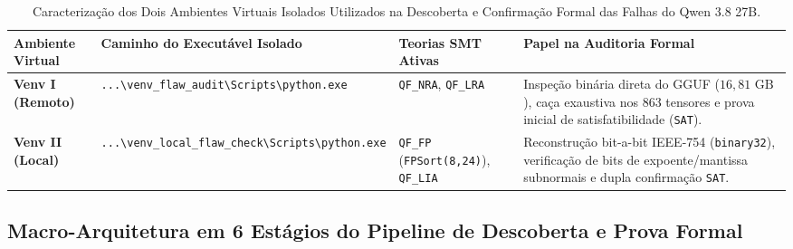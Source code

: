 \documentclass[11pt,a4paper]{article}
\theoremstyle{definition}
\begin{document}
\begin{table}[H]
\centering
\caption{Caracterização dos Dois Ambientes Virtuais Isolados Utilizados na Descoberta e Confirmação Formal das Falhas do Qwen 3.8 27B.}
\label{tab:venvs_audit}
\footnotesize
\setlength{\tabcolsep}{5pt}
\renewcommand{\arraystretch}{1.22}
\begin{tabularx}{\textwidth}{l l l X}
\toprule
\textbf{Ambiente Virtual} & \textbf{Caminho do Executável Isolado} & \textbf{Teorias SMT Ativas} & \textbf{Papel na Auditoria Formal} \\
\midrule
\textbf{Venv I (Remoto)} & \texttt{...\textbackslash venv\_flaw\_audit\textbackslash Scripts\textbackslash python.exe} & \texttt{QF\_NRA}, \texttt{QF\_LRA} & Inspeção binária direta do GGUF ($16{,}81\text{ GB}$), caça exaustiva nos 863 tensores e prova inicial de satisfatibilidade (\texttt{SAT}). \\
\textbf{Venv II (Local)} & \texttt{...\textbackslash venv\_local\_flaw\_check\textbackslash Scripts\textbackslash python.exe} & \texttt{QF\_FP} (\texttt{FPSort(8,24)}), \texttt{QF\_LIA} & Reconstrução bit-a-bit IEEE-754 (\texttt{binary32}), verificação de bits de expoente/mantissa subnormais e dupla confirmação \texttt{SAT}. \\
\bottomrule
\end{tabularx}
\end{table}

\subsection{Macro-Arquitetura em 6 Estágios do Pipeline de Descoberta e Prova Formal}
\end{document}
